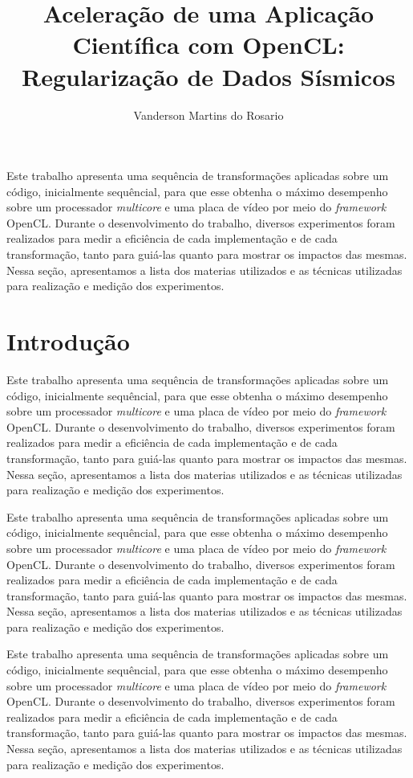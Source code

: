 \documentclass[12pt]{article}
\title{Aceleração de uma Aplicação Científica com OpenCL: Regularização de Dados Sísmicos}
\author{Vanderson Martins do Rosario\inst{1}}
\begin{document}
 

\maketitle
     
\begin{resumo} 
Este trabalho apresenta uma sequência de transformações aplicadas sobre um código, inicialmente sequêncial, para que esse obtenha o máximo desempenho sobre um processador \textit{multicore} e uma placa de vídeo por meio do \textit{framework} OpenCL. Durante o desenvolvimento do trabalho, diversos experimentos foram realizados para medir a eficiência de cada implementação e de cada transformação, tanto para guiá-las quanto para mostrar os impactos das mesmas. Nessa seção, apresentamos a lista dos materias utilizados e as técnicas utilizadas para realização e medição dos experimentos.
\end{resumo}


\section{Introdução}
Este trabalho apresenta uma sequência de transformações aplicadas sobre um código, inicialmente sequêncial, para que esse obtenha o máximo desempenho sobre um processador \textit{multicore} e uma placa de vídeo por meio do \textit{framework} OpenCL. Durante o desenvolvimento do trabalho, diversos experimentos foram realizados para medir a eficiência de cada implementação e de cada transformação, tanto para guiá-las quanto para mostrar os impactos das mesmas. Nessa seção, apresentamos a lista dos materias utilizados e as técnicas utilizadas para realização e medição dos experimentos.

Este trabalho apresenta uma sequência de transformações aplicadas sobre um código, inicialmente sequêncial, para que esse obtenha o máximo desempenho sobre um processador \textit{multicore} e uma placa de vídeo por meio do \textit{framework} OpenCL. Durante o desenvolvimento do trabalho, diversos experimentos foram realizados para medir a eficiência de cada implementação e de cada transformação, tanto para guiá-las quanto para mostrar os impactos das mesmas. Nessa seção, apresentamos a lista dos materias utilizados e as técnicas utilizadas para realização e medição dos experimentos.

Este trabalho apresenta uma sequência de transformações aplicadas sobre um código, inicialmente sequêncial, para que esse obtenha o máximo desempenho sobre um processador \textit{multicore} e uma placa de vídeo por meio do \textit{framework} OpenCL. Durante o desenvolvimento do trabalho, diversos experimentos foram realizados para medir a eficiência de cada implementação e de cada transformação, tanto para guiá-las quanto para mostrar os impactos das mesmas. Nessa seção, apresentamos a lista dos materias utilizados e as técnicas utilizadas para realização e medição dos experimentos.
\end{document}
